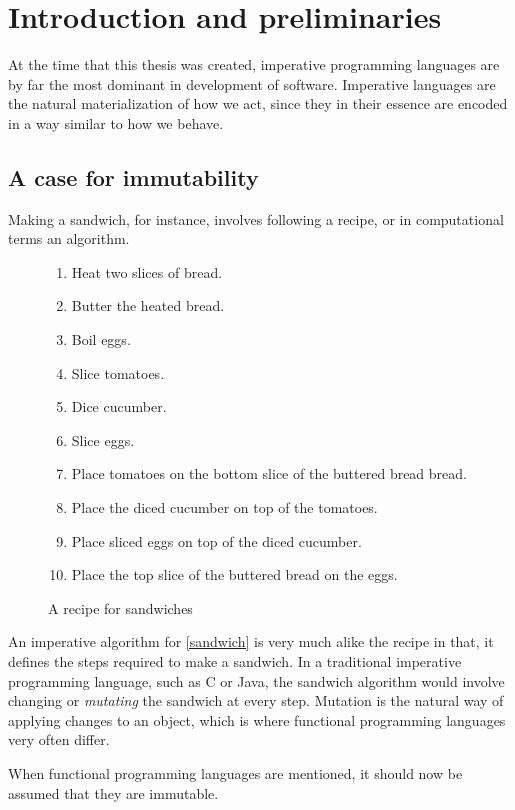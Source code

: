 \chapter{Introduction and preliminaries}
At the time that this thesis was created, imperative programming languages are by far the most dominant in development of software.
Imperative languages are the natural materialization of how we act, since they in their essence are encoded in a way similar to how we behave.

\section{A case for immutability}
Making a sandwich, for instance, involves following a recipe, or in computational terms an algorithm.
\begin{figure}[ht]
  \begin{enumerate}
    \item Heat two slices of bread.
    \item Butter the heated bread.
    \item Boil eggs.\label{boil}
    \item Slice tomatoes\label{tomatoes}.
    \item Dice cucumber.\label{dice}
    \item Slice eggs.
    \item Place tomatoes on the bottom slice of the buttered bread bread.
    \item Place the diced cucumber on top of the tomatoes.
    \item Place sliced eggs on top of the diced cucumber.
    \item Place the top slice of the buttered bread on the eggs. 
  \end{enumerate}
  \caption{A recipe for sandwiches}
  \label{sandwich}
\end{figure}
An imperative algorithm for \autoref{sandwich} is very much alike the recipe in that, it defines the steps required to make a sandwich.
In a traditional imperative programming language, such as C or Java, the sandwich algorithm would involve changing or \textit{mutating} the sandwich at every step.
Mutation is the natural way of applying changes to an object, which is where functional programming languages very often differ.
\begin{remark}
When functional programming languages are mentioned, it should now be assumed that they are immutable.
\end{remark}

